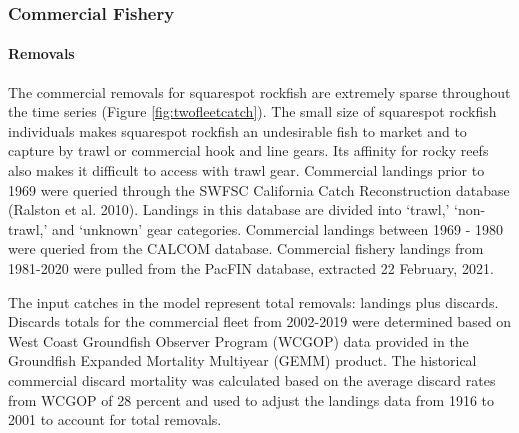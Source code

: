 \documentclass[11pt,
  english,
  a4paper,
]{article}
\begin{document}
\leavevmode\tagmcend\tagstructend\par


\hypertarget{commercial-fishery}{%
\subsubsection{Commercial Fishery}\label{commercial-fishery}}

\leavevmode\tagmcend\tagstructend


\hypertarget{removals-1}{%
\paragraph{Removals}\label{removals-1}}

\leavevmode\tagmcend\tagstructend


The commercial removals for squarespot rockfish are extremely sparse throughout the time series (Figure \ref{fig:twofleetcatch}). The small size of squarespot rockfish individuals makes squarespot rockfish an undesirable fish to market and to capture by trawl or commercial hook and line gears. Its affinity for rocky reefs also makes it difficult to access with trawl gear. Commercial landings prior to 1969 were queried through the SWFSC California Catch Reconstruction database {(Ralston et al. 2010)\leavevmode\tagmcend\tagstructend}. Landings in this database are divided into `trawl,' `non-trawl,' and `unknown' gear categories. Commercial landings between 1969 - 1980 were queried from the CALCOM database. Commercial fishery landings from 1981-2020 were pulled from the PacFIN database, extracted 22 February, 2021.

\leavevmode\tagmcend\tagstructend\par


The input catches in the model represent total removals: landings plus discards. Discards totals for the commercial fleet from 2002-2019 were determined based on West Coast Groundfish Observer Program (WCGOP) data provided in the Groundfish Expanded Mortality Multiyear (GEMM) product. The historical commercial discard mortality was calculated based on the average discard rates from WCGOP of 28 percent and used to adjust the landings data from 1916 to 2001 to account for total removals.
\end{document}
